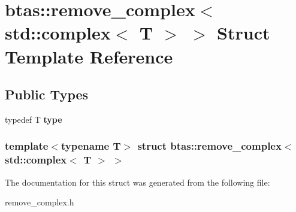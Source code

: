 \hypertarget{structbtas_1_1remove__complex_3_01std_1_1complex_3_01_t_01_4_01_4}{
\section{btas::remove\_\-complex$<$ std::complex$<$ T $>$ $>$ Struct Template Reference}
\label{structbtas_1_1remove__complex_3_01std_1_1complex_3_01_t_01_4_01_4}
}
\subsection*{Public Types}
\begin{DoxyCompactItemize}
\item 
\hypertarget{structbtas_1_1remove__complex_3_01std_1_1complex_3_01_t_01_4_01_4_aa9a8a65ecae1f134f1593cda79f8ff07}{
typedef T {\bfseries type}}
\label{structbtas_1_1remove__complex_3_01std_1_1complex_3_01_t_01_4_01_4_aa9a8a65ecae1f134f1593cda79f8ff07}

\end{DoxyCompactItemize}
\subsubsection*{template$<$typename T$>$ struct btas::remove\_\-complex$<$ std::complex$<$ T $>$ $>$}



The documentation for this struct was generated from the following file:\begin{DoxyCompactItemize}
\item 
remove\_\-complex.h\end{DoxyCompactItemize}
